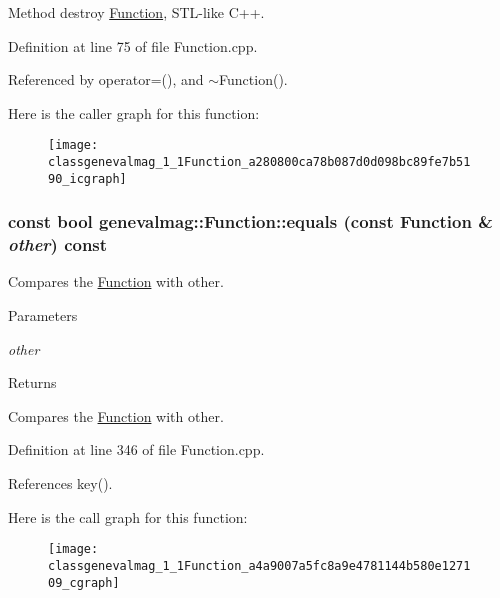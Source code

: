 Method destroy \hyperlink{classgenevalmag_1_1Function}{Function}, STL-\/like C++. 

Definition at line 75 of file Function.cpp.



Referenced by operator=(), and $\sim$Function().



Here is the caller graph for this function:\nopagebreak
\begin{figure}[H]
\begin{center}
\leavevmode
\texttt{[image: classgenevalmag\_1\_1Function\_a280800ca78b087d0d098bc89fe7b5190\_icgraph]}
\end{center}
\end{figure}


\hypertarget{classgenevalmag_1_1Function_a4a9007a5fc8a9e4781144b580e127109}{
\subsubsection[{equals}]{\setlength{\rightskip}{0pt plus 5cm}const bool genevalmag::Function::equals (const {\bf Function} \& {\em other}) const}}
\label{classgenevalmag_1_1Function_a4a9007a5fc8a9e4781144b580e127109}
Compares the \hyperlink{classgenevalmag_1_1Function}{Function} with other. 
\begin{DoxyParams}{Parameters}
\item[{\em other}]\end{DoxyParams}
\begin{DoxyReturn}{Returns}

\end{DoxyReturn}
Compares the \hyperlink{classgenevalmag_1_1Function}{Function} with other. 

Definition at line 346 of file Function.cpp.



References key().



Here is the call graph for this function:\nopagebreak
\begin{figure}[H]
\begin{center}
\leavevmode
\texttt{[image: classgenevalmag\_1\_1Function\_a4a9007a5fc8a9e4781144b580e127109\_cgraph]}
\end{center}
\end{figure}


